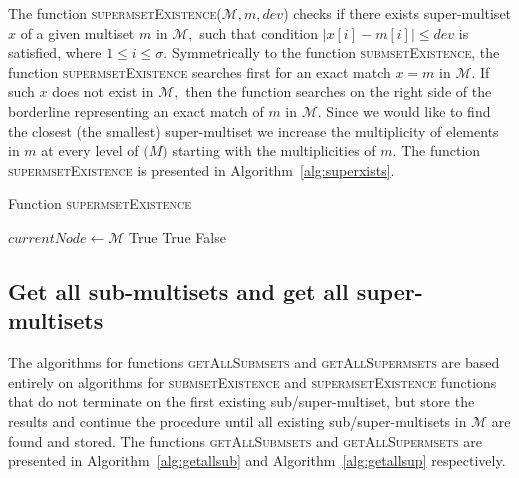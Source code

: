 The function \textsc{supermsetExistence}($\mathcal{M},m,dev$) checks if there 
exists super-multiset $x$ of a given multiset $m$ in $\mathcal{M},$ such that 
condition $| x[i] - m[i] |\leq dev$ is satisfied, where $1\leq i \leq \sigma.$
Symmetrically to the function \textsc{submsetExistence}, the function
\textsc{supermsetExistence} searches first for an exact match $x=m$ in
$\mathcal{M}.$ If such $x$ does not exist in $\mathcal{M},$ then
the function searches on the right side of the borderline representing
an exact match of $m$ in $\mathcal{M}.$ Since we would like to find
the closest (the smallest) super-multiset we increase the multiplicity of
elements in $m$ at every level of $\mathcal(M)$ starting with
the multiplicities of $m.$ The function \textsc{supermsetExistence}
is presented in Algorithm~\ref{alg:superxists}.


\begin{algorithm}[h!]
\caption{Function \textsc{supermsetExistence}}
\label{alg:superxists}
\begin{algorithmic}[1]
\State $currentNode \gets \mathcal{M}$
\State \Return True
\EndIf
{}
\State \Return True
\EndIf
\EndIf
\EndFor
\State \Return False
\EndFunction
\end{algorithmic}
\end{algorithm}


\subsection{Get all sub-multisets and get all super-multisets} \label{s:getall}
The algorithms for functions \textsc{getAllSubmsets} and 
\textsc{getAllSupermsets} are based entirely on algorithms for 
\textsc{submsetExistence} and \textsc{supermsetExistence} functions that do not 
terminate on the first existing sub/super-multiset, but store the results and 
continue the procedure until all existing sub/super-multisets in $\mathcal{M}$ are 
found and stored. The functions \textsc{getAllSubmsets} and \textsc{getAllSupermsets} 
are presented in Algorithm~\ref{alg:getallsub} and Algorithm~\ref{alg:getallsup} respectively.

